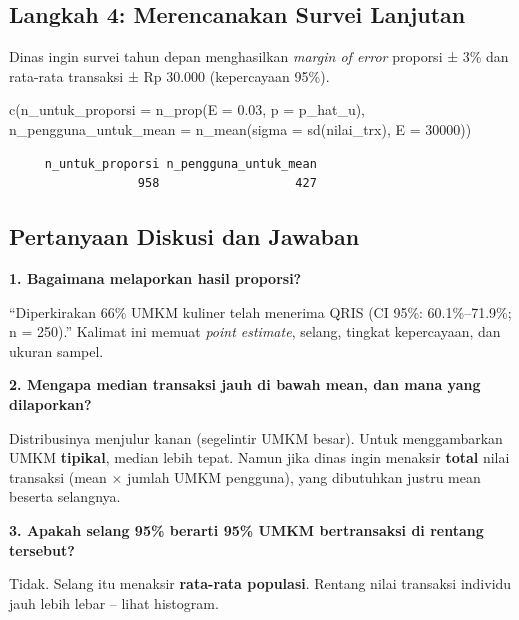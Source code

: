 \documentclass[
  indonesian,
  letterpaper,
]{book}
\newenvironment{Shaded}{\begin{snugshade}}{\end{snugshade}}
\newcommand{\AttributeTok}[1]{\textcolor[rgb]{0.40,0.45,0.13}{#1}}
\newcommand{\DecValTok}[1]{\textcolor[rgb]{0.68,0.00,0.00}{#1}}
\newcommand{\FloatTok}[1]{\textcolor[rgb]{0.68,0.00,0.00}{#1}}
\newcommand{\FunctionTok}[1]{\textcolor[rgb]{0.28,0.35,0.67}{#1}}
\newcommand{\NormalTok}[1]{\textcolor[rgb]{0.00,0.23,0.31}{#1}}
\begin{document}
\subsection{Langkah 4: Merencanakan Survei
Lanjutan}\label{langkah-4-merencanakan-survei-lanjutan}

Dinas ingin survei tahun depan menghasilkan \emph{margin of error}
proporsi ± 3\% dan rata-rata transaksi ± Rp 30.000 (kepercayaan 95\%).

\begin{Shaded}
\begin{Highlighting}[]
\FunctionTok{c}\NormalTok{(}\AttributeTok{n\_untuk\_proporsi =} \FunctionTok{n\_prop}\NormalTok{(}\AttributeTok{E =} \FloatTok{0.03}\NormalTok{, }\AttributeTok{p =}\NormalTok{ p\_hat\_u),}
  \AttributeTok{n\_pengguna\_untuk\_mean =} \FunctionTok{n\_mean}\NormalTok{(}\AttributeTok{sigma =} \FunctionTok{sd}\NormalTok{(nilai\_trx), }\AttributeTok{E =} \DecValTok{30000}\NormalTok{))}
\end{Highlighting}
\end{Shaded}

\begin{verbatim}
     n_untuk_proporsi n_pengguna_untuk_mean 
                  958                   427 
\end{verbatim}

\subsection{Pertanyaan Diskusi dan
Jawaban}\label{pertanyaan-diskusi-dan-jawaban}

\textbf{1. Bagaimana melaporkan hasil proporsi?}

``Diperkirakan 66\% UMKM kuliner telah menerima QRIS (CI 95\%:
60.1\%--71.9\%; n = 250).'' Kalimat ini memuat \emph{point estimate},
selang, tingkat kepercayaan, dan ukuran sampel.

\textbf{2. Mengapa median transaksi jauh di bawah mean, dan mana yang
dilaporkan?}

Distribusinya menjulur kanan (segelintir UMKM besar). Untuk
menggambarkan UMKM \textbf{tipikal}, median lebih tepat. Namun jika
dinas ingin menaksir \textbf{total} nilai transaksi (mean \(\times\)
jumlah UMKM pengguna), yang dibutuhkan justru mean beserta selangnya.

\textbf{3. Apakah selang 95\% berarti 95\% UMKM bertransaksi di rentang
tersebut?}

Tidak. Selang itu menaksir \textbf{rata-rata populasi}. Rentang nilai
transaksi individu jauh lebih lebar -- lihat histogram.
\end{document}
